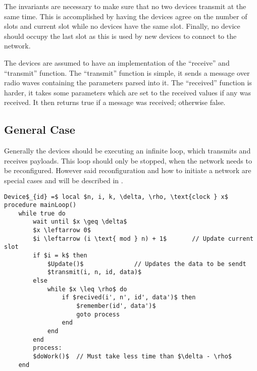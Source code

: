 The invariants are necessary to make sure that no two devices transmit at the same time. 
This is accomplished by having the devices agree on the number of slots and current slot while no devices have the same slot. 
Finally, no device should occupy the last slot as this is used by new devices to connect to the network.

The devices are assumed to have an implementation of the \enquote{receive} and \enquote{transmit} function.
The \enquote{transmit} function is simple, it sends a message over radio waves containing the parameters parsed into it.
The \enquote{received} function is harder, it takes some parameters which are set to the received values if any was received. 
It then returns true if a message was received; otherwise false.
                    
\subsection{General Case} %
\label{sub:general_case}
Generally the devices should be executing an infinite loop, which transmits and receives payloads.
This loop should only be stopped, when the network needs to be reconfigured.
However said reconfiguration and how to initiate a network are special cases and will be described in .

\begin{lstlisting}[style=pseudocode,mathescape=true,caption={Pseudocode example of the main loop}] 
Device$_{id} =$ local $n, i, k, \delta, \rho, \text{clock } x$ 
procedure mainLoop()
	while true do
		wait until $x \geq \delta$
		$x \leftarrow 0$
		$i \leftarrow (i \text{ mod } n) + 1$		// Update current slot
		if $i = k$ then
			$Update()$				// Updates the data to be sendt
			$transmit(i, n, id, data)$
		else 
			while $x \leq \rho$ do
				if $recived(i', n', id', data')$ then
					$remember(id', data')$
					goto process
				end
			end
		end
		process:
		$doWork()$	// Must take less time than $\delta - \rho$	
	end
\end{lstlisting}  

            